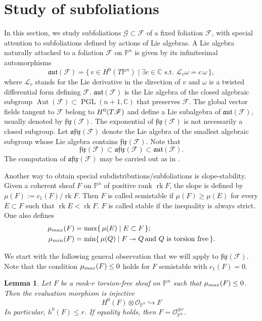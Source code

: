 \documentclass[twoside]{amsart}
\numberwithin{equation}{section}
\newcommand{\opn}{{\mathcal O}_{\mathbb{P}^{n}}}
\newcommand{\pn}{{\mathbb{P}^{n}}}
\newcommand{\tpn}{T{\mathbb{P}^{n}}}
\DeclareMathOperator{\rk}{rk}
\def\CC{{\mathbb{C}}}
\newcommand{\sF}{\mathscr{F}}
\newcommand{\sG}{\mathscr{G}}
\newcommand{\tF}{{\rm T}\sF}
\newcommand{\aut}{\mathfrak{aut}}
\newcommand{\fix}{\mathfrak{fix}}
\newcommand{\afix}{\mathfrak{afix}}
\DeclareMathOperator{\Aut}{Aut}
\DeclareMathOperator{\PGL}{PGL}
\newcommand{\lieder}{\mathcal{L}}
\newtheorem{lemma}[theorem]{Lemma}
\theoremstyle{definition}
\begin{document}
\section{Study of subfoliations}\label{sec:subfol}
In this section, we study subfoliations $\sG \subset \sF$ of a fixed foliation $\sF$, with special attention to subfoliations defined by actions of Lie algebras. A Lie algebra naturally attached to a foliation $\sF$ on $\pn$ is given by its infinitesimal automorphisms
\[
\aut(\sF) = \{\, v \in H^0(\tpn) \mid \exists c\in \CC \text{ s.t. } \lieder_v\omega =c\,\omega \,\},
\]
where $\lieder_v$ stands for the Lie derivative in the direction of $v$ and $\omega$ is a twisted differential form defining $\sF$. $\aut(\sF)$ is the Lie algebra of the closed algebraic subgroup $\Aut(\sF) \subset \PGL(n+1,\CC)$ that preserves $\sF$. The global vector fields tangent to $\sF$ belong to $H^0(\tF)$ and define a Lie subalgebra of $\aut(\sF)$, usually denoted by $\fix(\sF)$. The exponential of $\fix(\sF)$ is not necessarily a closed subgroup. Let $\afix(\sF)$ denote the Lie algebra of the smallest algebraic subgroup whose Lie algebra contains $\fix(\sF)$. Note that
\[
\fix(\sF) \subset \afix(\sF) \subset \aut(\sF).
\]
The computation of $\afix(\sF)$ may be carried out as in \cite[Chapter II, \S7]{Borel}. 

 
Another way to obtain special subdistributions/subfoliations is slope-stability. Given a coherent sheaf $F$ on $\pn$ of positive rank $\rk F$, the slope is defined by $\mu(F) :=c_1(F)/\rk F$. Then $F$ is called semistable if $\mu(F) \geq \mu(E)$ for every $E\subset F$ such that $\rk E <\rk F$. $F$ is called stable if the inequality is always strict. One also defines
\begin{align*}
    \mu_{\rm max}(F) &= \max \{\, \mu(E) \mid E \subset F \,\}; \\
    \mu_{\rm min}(F) &= \min \{\, \mu(Q) \mid F \twoheadrightarrow Q \, \text{and } Q \text{ is torsion free}  \,\}.
\end{align*}

We start with the following general observation that we will apply to $\fix(\sF)$. Note that the condition $\mu_{\rm max}(F) \leq 0$ holds for $F$ semistable with $c_1(F) = 0$. 

\begin{lemma}\label{lem:sstab-h0}
Let $F$ be a rank-$r$ torsion-free sheaf on $\pn$ such that $\mu_{\rm max}(F) \leq 0$. Then the evaluation morphism is injective
\[
H^0(F) \otimes \opn \hookrightarrow F
\]
In particular, $h^0(F) \leq r$. If equality holds, then $F = \opn^{\oplus r}$. 
\end{lemma}
\end{document}
